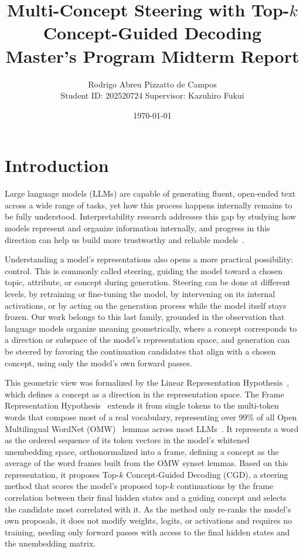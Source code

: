 \documentclass[a4paper,10pt,twocolumn]{article}
\title{Multi-Concept Steering with Top-$k$ Concept-Guided Decoding\\[2pt]
\large Master's Program Midterm Report}
\author{Rodrigo Abreu Pizzatto de Campos\\[2pt]
\normalsize Student ID: 202520724 
\qquad Supervisor: Kazuhiro Fukui}
\date{\today}
\begin{document}
\maketitle

\section{Introduction}
Large language models (LLMs) are capable of generating fluent, open-ended text across a wide range of tasks, yet how this process happens internally remains to be fully understood. Interpretability research addresses this gap by studying how models represent and organize information internally, and progress in this direction can help us build more trustworthy and reliable models~\cite{hooker2019benchmark}.

Understanding a model's representations also opens a more practical possibility: control. This is commonly called steering, guiding the model toward a chosen topic, attribute, or concept during generation. Steering can be done at different levels, by retraining or fine-tuning the model, by intervening on its internal activations, or by acting on the generation process while the model itself stays frozen. Our work belongs to this last family, grounded in the observation that language models organize meaning geometrically, where a concept corresponds to a direction or subspace of the model's representation space, and generation can be steered by favoring the continuation candidates that align with a chosen concept, using only the model's own forward passes.

This geometric view was formalized by the Linear Representation Hypothesis~\cite{park2024lrh}, which defines a concept as a direction in the representation space. The Frame Representation Hypothesis~\cite{valois2025frh} extends it from single tokens to the multi-token words that compose most of a real vocabulary, representing over 99\% of all Open Multilingual WordNet (OMW)~\cite{bond2013omw} lemmas across most LLMs~\cite{valois2025frh}. It represents a word as the ordered sequence of its token vectors in the model's whitened unembedding space, orthonormalized into a frame, defining a concept as the average of the word frames built from the OMW synset lemmas. Based on this representation, it proposes Top-$k$ Concept-Guided Decoding (CGD), a steering method that scores the model's proposed top-$k$ continuations by the frame correlation between their final hidden states and a guiding concept and selects the candidate most correlated with it. As the method only re-ranks the model's own proposals, it does not modify weights, logits, or activations and requires no training, needing only forward passes with access to the final hidden states and the unembedding matrix.
\end{document}
